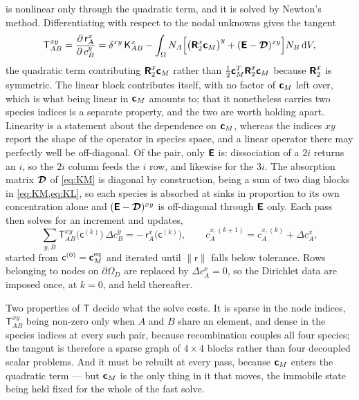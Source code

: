  is nonlinear only through the quadratic term, and it is
solved by Newton's method. Differentiating with respect to the nodal unknowns
gives the tangent
\begin{equation}
  \mathsf T^{xy}_{AB}
    =\frac{\partial\,\mathsf r^{x}_{A}}{\partial\,c^{y}_{B}}
    =\delta^{xy}\,\mathsf K^{x}_{AB}
     -\int_\Omega N_A\Bigl[\bigl(\bm{\mathsf{R}}_2^{x}\bm{\mathsf{c}}_M\bigr)^{y}
       +(\bm{\mathsf{E}}-\bm{\mathcal{D}})^{xy}\Bigr]N_B\,\mathrm dV,
  \label{eq:fe-tangent}
\end{equation}
the quadratic term contributing $\bm{\mathsf{R}}_2^{x}\bm{\mathsf{c}}_M$ rather than
$\tfrac12\bm{\mathsf{c}}_M^{T}\bm{\mathsf{R}}_2^{x}\bm{\mathsf{c}}_M$ because $\bm{\mathsf{R}}_2^{x}$ is
symmetric. The linear block contributes itself, with no factor of $\bm{\mathsf{c}}_M$
left over, which is what being linear in $\bm{\mathsf{c}}_M$ amounts to; that it
nonetheless carries two species indices is a separate property, and the two are
worth holding apart. Linearity is a statement about the dependence on
$\bm{\mathsf{c}}_M$, whereas the indices $xy$ report the shape of the operator in
species space, and a linear operator there may perfectly well be off-diagonal.
Of the pair, only $\bm{\mathsf{E}}$ is: dissociation of a $2i$ returns an $i$, so the
$2i$ column feeds the $i$ row, and likewise for the $3i$. The absorption matrix
$\bm{\mathcal{D}}$ of \cref{eq:KM} is diagonal by construction, being a sum of two
$\mathrm{diag}$ blocks in \cref{eq:KM,eq:KL}, so each species is absorbed at
sinks in proportion to its own concentration alone and
$(\bm{\mathsf{E}}-\bm{\mathcal{D}})^{xy}$ is off-diagonal through $\bm{\mathsf{E}}$ only. Each pass
then solves for an increment and updates,
\begin{equation}
  \sum_{y,B}\mathsf T^{xy}_{AB}\bigl(\mathsf c^{(k)}\bigr)\,\Delta c^{y}_{B}
    =-\,\mathsf r^{x}_{A}\bigl(\mathsf c^{(k)}\bigr),
  \qquad
  c^{x,(k+1)}_{A}=c^{x,(k)}_{A}+\Delta c^{x}_{A},
  \label{eq:newton}
\end{equation}
started from $\mathsf c^{(0)}=\bm{\mathsf{c}}_M^{\mathrm{eq}}$ and iterated until
$\lVert\mathsf r\rVert$ falls below tolerance. Rows belonging to nodes on
$\partial\Omega_D$ are replaced by $\Delta c^{x}_{A}=0$, so the Dirichlet data
are imposed once, at $k=0$, and held thereafter.

Two properties of $\mathsf T$ decide what the solve costs. It is sparse in the
node indices, $\mathsf T^{xy}_{AB}$ being non-zero only when $A$ and $B$ share
an element, and dense in the species indices at every such pair, because
recombination couples all four species; the tangent is therefore a sparse graph
of $4\times4$ blocks rather than four decoupled scalar problems. And it must be
rebuilt at every pass, because $\bm{\mathsf{c}}_M$ enters the quadratic term --- but
$\bm{\mathsf{c}}_M$ is the only thing in it that moves, the immobile state being held
fixed for the whole of the fast solve.

